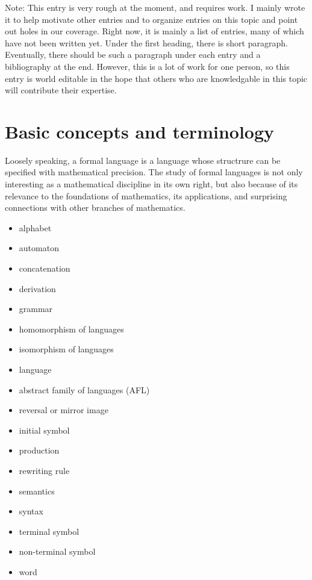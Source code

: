 \documentclass[12pt]{article}
\begin{document}
Note: This entry is very rough at the moment, and requires work. I mainly wrote it to help motivate other entries and to organize entries on this topic and point out holes in our coverage.  Right now, it is mainly a list of entries, many of which have not been written yet.  Under the first heading, there is short paragraph.  Eventually, there should be such a paragraph under each entry and a bibliography at the end.  However, this is a lot of work for one person, so this entry is world editable in the hope that others who are knowledgable in this topic will contribute their expertise.

\section{Basic concepts and terminology}

Loosely speaking, a formal language is a language whose structrure can be specified with mathematical precision.  The study of formal languages is not only interesting as a mathematical discipline in its own right, but also because of its relevance to the foundations of mathematics, its applications, and surprising connections with other branches of mathematics.

\begin{itemize}
\item alphabet
\item automaton
\item concatenation
\item derivation
\item grammar
\item homomorphism of languages
\item isomorphism of languages
\item language
\item abstract family of languages (AFL)
\item reversal or mirror image
\item initial symbol
\item production
\item rewriting rule
\item semantics
\item syntax
\item terminal symbol
\item non-terminal symbol
\item word
\end{itemize}
\end{document}
